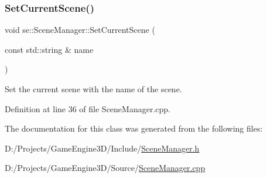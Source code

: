 \mbox{\label{classse_1_1_scene_manager_a8eff0a05036942247f81fe4915ffce50}} 
\subsubsection{\texorpdfstring{Set\+Current\+Scene()}{SetCurrentScene()}}
{\footnotesize\ttfamily void se\+::\+Scene\+Manager\+::\+Set\+Current\+Scene (\begin{DoxyParamCaption}\item[{const std\+::string \&}]{name }\end{DoxyParamCaption})}

Set the current scene with the name of the scene. 

Definition at line 36 of file Scene\+Manager.\+cpp.



The documentation for this class was generated from the following files\+:\begin{DoxyCompactItemize}
\item 
D\+:/\+Projects/\+Game\+Engine3\+D/\+Include/\mbox{\hyperlink{_scene_manager_8h}{Scene\+Manager.\+h}}\item 
D\+:/\+Projects/\+Game\+Engine3\+D/\+Source/\mbox{\hyperlink{_scene_manager_8cpp}{Scene\+Manager.\+cpp}}\end{DoxyCompactItemize}

